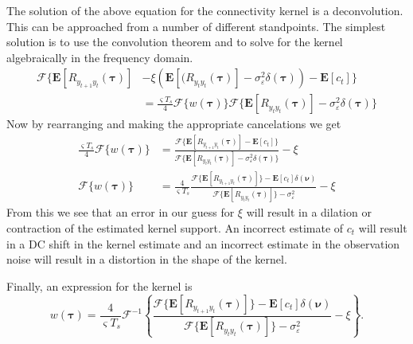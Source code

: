 \documentclass[conference,onecolumn]{IEEEtran}
\begin{document}
The solution of the above equation for the connectivity kernel is a deconvolution. This can be approached from a number of different standpoints. The simplest solution is to use the convolution theorem and to solve for the kernel algebraically in the frequency domain. %
\begin{align}
	\mathcal{F}\{\mathbf{E}[R_{y_{t+1}y_t}(\boldsymbol{\tau})] &- \xi\left(\mathbf{E}[ (R_{y_ty_t}(\boldsymbol{\tau})] - \sigma_{\varepsilon}^2 \delta(\boldsymbol{\tau})\right) - \mathbf{E}\left[c_t\right]\} \nonumber \\
	&=\frac{\varsigma T_s}{4}\mathcal{F}\{w(\boldsymbol\tau)\}\mathcal{F}\{\mathbf{E}\left[R_{y_ty_t}(\boldsymbol\tau)\right] - \sigma_{\varepsilon}^2 \delta(\boldsymbol\tau)\}
\end{align}
Now by rearranging and making the appropriate cancelations we get
\begin{align}
	\frac{\varsigma T_s}{4}\mathcal{F}\{w(\boldsymbol\tau)\} &= \frac{\mathcal{F}\{\mathbf{E}[R_{y_{t+1}y_t}(\boldsymbol{\tau})] - \mathbf{E}\left[c_t\right]\}}{\mathcal{F}\{\mathbf{E}\left[R_{y_ty_t}(\boldsymbol\tau)\right] - \sigma_{\varepsilon}^2 \delta(\boldsymbol\tau)\}} - \xi \\
	\mathcal{F}\{w(\boldsymbol\tau)\} &= \frac{4}{\varsigma T_s}\frac{\mathcal{F}\{\mathbf{E}[R_{y_{t+1}y_t}(\boldsymbol{\tau})]\} - \mathbf{E}\left[c_t\right]\delta(\boldsymbol{\nu})}{\mathcal{F}\{\mathbf{E}\left[R_{y_ty_t}(\boldsymbol\tau)\right]\} - \sigma_{\varepsilon}^2 } - \xi \label{eq:Fourier_TF_of_Kernel}
\end{align}
From this we see that an error in our guess for $\xi$ will result in a dilation or contraction of the estimated kernel support. An incorrect estimate of $c_t$ will result in a DC shift in the kernel estimate and an incorrect estimate in the observation noise will result in a distortion in the shape of the kernel.

Finally, an expression for the kernel is
\begin{equation}
	w(\boldsymbol\tau) = \frac{4}{\varsigma T_s}\mathcal{F}^{-1}\left\{\frac{\mathcal{F}\{\mathbf{E}[R_{y_{t+1}y_t}(\boldsymbol{\tau})]\} - \mathbf{E}\left[c_t\right]\delta(\boldsymbol{\nu})}{\mathcal{F}\{\mathbf{E}\left[R_{y_ty_t}(\boldsymbol\tau)\right]\} - \sigma_{\varepsilon}^2 } - \xi\right\}.
\end{equation}
\end{document}

